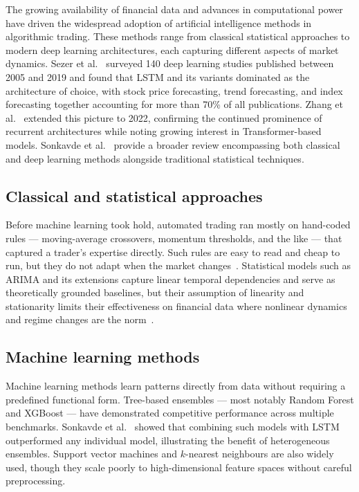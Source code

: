 The growing availability of financial data and advances in computational
power have driven the widespread adoption of artificial intelligence
methods in algorithmic trading. These methods range from classical
statistical approaches to modern deep learning architectures, each
capturing different aspects of market dynamics. Sezer et
al.~\cite{sezer2020financial} surveyed 140 deep learning studies
published between 2005 and 2019 and found that LSTM and its variants
dominated as the architecture of choice, with stock price forecasting,
trend forecasting, and index forecasting together accounting for more
than 70\% of all publications. Zhang et al.~\cite{zhang2024deep}
extended this picture to 2022, confirming the continued prominence of
recurrent architectures while noting growing interest in Transformer-based
models. Sonkavde et al.~\cite{sonkavde2023forecasting} provide a broader
review encompassing both classical and deep learning methods alongside
traditional statistical techniques.

\subsection{Classical and statistical approaches}
Before machine learning took hold, automated trading ran mostly on
hand-coded rules --- moving-average crossovers, momentum thresholds, and
the like --- that captured a trader's expertise directly. Such rules are
easy to read and cheap to run, but they do not adapt when the market
changes~\cite{sonkavde2023forecasting}. Statistical
models such as ARIMA and its extensions capture linear temporal
dependencies and serve as theoretically grounded baselines, but their
assumption of linearity and stationarity limits their effectiveness on
financial data where nonlinear dynamics and regime changes are the
norm~\cite{zhang2024deep, sonkavde2023forecasting}.

\subsection{Machine learning methods}
Machine learning methods learn patterns directly from data without
requiring a predefined functional form. Tree-based ensembles — most
notably Random Forest and XGBoost — have demonstrated competitive
performance across multiple benchmarks. Sonkavde et
al.~\cite{sonkavde2023forecasting} showed that combining such models with
LSTM outperformed any individual model, illustrating the benefit of
heterogeneous ensembles. Support vector machines and $k$-nearest
neighbours are also widely used, though they scale poorly to
high-dimensional feature spaces without careful preprocessing.

